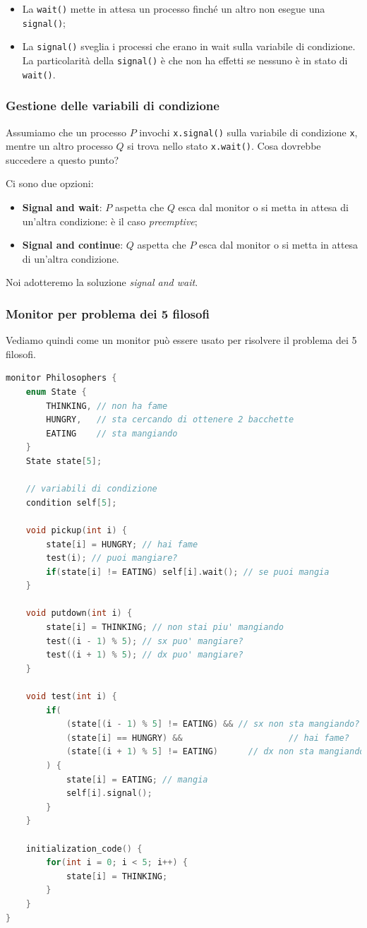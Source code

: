 \documentclass[a4paper,11pt]{article}
\begin{document}
\begin{itemize}
	\item La \lstinline|wait()| mette in attesa un processo finché un altro non esegue una \lstinline|signal()|;
	\item La \lstinline|signal()| sveglia i processi che erano in wait sulla variabile di condizione. La particolarità della \lstinline|signal()| è che non ha effetti se nessuno è in stato di \lstinline|wait()|.
\end{itemize}


\subsubsection{Gestione delle variabili di condizione}
Assumiamo che un processo $P$ invochi \lstinline|x.signal()| sulla variabile di condizione \lstinline|x|, mentre un altro processo $Q$ si trova nello stato \lstinline|x.wait()|. Cosa dovrebbe succedere a questo punto? 

Ci sono due opzioni:
\begin{itemize}
	\item \textbf{Signal and wait}: $P$ aspetta che $Q$ esca dal monitor o si metta in attesa di un'altra condizione: è il caso \textit{preemptive};
	\item \textbf{Signal and continue}: $Q$ aspetta che $P$ esca dal monitor o si metta in attesa di un'altra condizione.
\end{itemize}

Noi adotteremo la soluzione \textit{signal and wait}.

\subsubsection{Monitor per problema dei 5 filosofi}
Vediamo quindi come un monitor può essere usato per risolvere il problema dei 5 filosofi.
\begin{lstlisting}[language=C++, style=codestyle]	
monitor Philosophers {
	enum State {
		THINKING, // non ha fame
		HUNGRY,   // sta cercando di ottenere 2 bacchette
		EATING    // sta mangiando
	}
	State state[5];

	// variabili di condizione
	condition self[5];

	void pickup(int i) {
		state[i] = HUNGRY; // hai fame
		test(i); // puoi mangiare?
		if(state[i] != EATING) self[i].wait(); // se puoi mangia
	}

	void putdown(int i) {
		state[i] = THINKING; // non stai piu' mangiando
		test((i - 1) % 5); // sx puo' mangiare?
		test((i + 1) % 5); // dx puo' mangiare?
	}

	void test(int i) {
		if(
			(state[(i - 1) % 5] != EATING) && // sx non sta mangiando?
			(state[i] == HUNGRY) && 					// hai fame?
			(state[(i + 1) % 5] != EATING)		// dx non sta mangiando?
		) {
			state[i] = EATING; // mangia
			self[i].signal();
		}
	}

	initialization_code() {
		for(int i = 0; i < 5; i++) {
			state[i] = THINKING;
		}
	}
}
\end{lstlisting}
\end{document}
